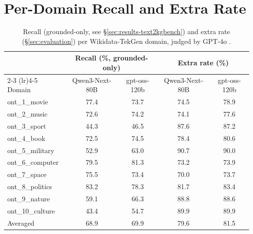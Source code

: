 \documentclass[11pt]{article}
\begin{document}

\section{Per-Domain Recall and Extra Rate}
\label{sec:appendix-per-domain}

\begin{table}[t]
\centering
\small
\begin{tabular}{lcccc}
\toprule
& \multicolumn{2}{c}{Recall (\%, grounded-only)} & \multicolumn{2}{c}{Extra rate (\%)} \\
\cmidrule(lr){2-3} \cmidrule(lr){4-5}
Domain & Qwen3-Next-80B & gpt-oss-120b & Qwen3-Next-80B & gpt-oss-120b \\
\midrule
ont\_1\_movie     & 77.4 & 73.7 & 74.5 & 78.9 \\
ont\_2\_music     & 72.6 & 74.2 & 74.1 & 77.6 \\
ont\_3\_sport     & 44.3 & 46.5 & 87.6 & 87.2 \\
ont\_4\_book      & 72.5 & 74.5 & 78.4 & 80.6 \\
ont\_5\_military  & 52.9 & 63.0 & 90.7 & 90.0 \\
ont\_6\_computer  & 79.5 & 81.3 & 73.2 & 73.9 \\
ont\_7\_space     & 75.5 & 73.4 & 70.0 & 73.7 \\
ont\_8\_politics  & 83.2 & 78.3 & 81.7 & 83.4 \\
ont\_9\_nature    & 59.1 & 66.3 & 88.8 & 88.6 \\
ont\_10\_culture  & 43.4 & 54.7 & 89.9 & 89.9 \\
\midrule
Averaged & 68.9 & 69.9 & 79.6 & 81.5 \\
\bottomrule
\end{tabular}
\caption{Recall (grounded-only, see \S\ref{sec:results-text2kgbench}) and extra rate (\S\ref{sec:evaluation}) per Wikidata-TekGen domain, judged by GPT-4o \citep{openai2024gpt4o}.}
\label{tab:text2kgbench-separate}
\end{table}
\end{document}
